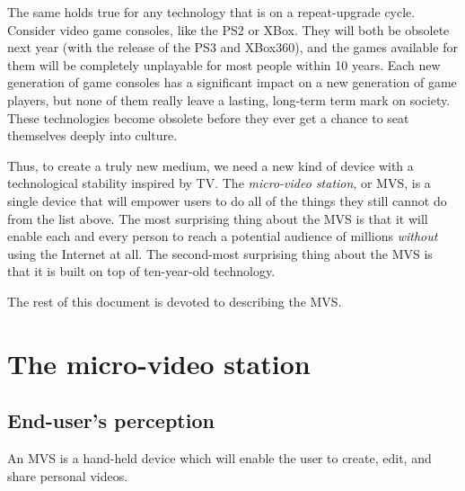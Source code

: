 \documentclass[12pt]{article}
\begin{document}
The same holds true for any technology that is on a repeat-upgrade cycle.
Consider video game consoles, like the PS2 or XBox.
They will both be obsolete next year (with the release of the PS3 and XBox360), and the games available for them will be completely unplayable for most people within 10 years.
Each new generation of game consoles has a significant impact on a new generation of game players, but none of them really leave a lasting, long-term term mark on society.
These technologies become obsolete before they ever get a chance to seat themselves deeply into culture.

Thus, to create a truly new medium, we need a new kind of device with a technological stability inspired by TV.
The {\it micro-video station}, or MVS, is a single device that will empower users to do all of the things they still cannot do from the list above.
The most surprising thing about the MVS is that it will enable each and every person to reach a potential audience of millions {\it without} using the Internet at all.
The second-most surprising thing about the MVS is that it is built on top of ten-year-old technology.

The rest of this document is devoted to describing the MVS. 


\section{The micro-video station}

\subsection{End-user's perception}

An MVS is a hand-held device which will enable the user to create, edit, and share personal videos.
\end{document}
